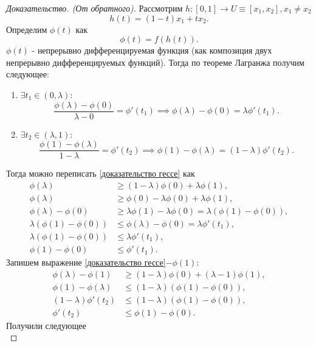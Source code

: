 \begin{theorem}
\begin{proof}[Доказательство. (От обратного)]
		Рассмотрим $h: [0,1]\to U \equiv [x_1, x_2], x_1\neq x_2$
		\begin{equation*}
			h(t)=(1-t)x_1 + tx_2.
		\end{equation*}
		Определим $\phi(t)$ как
		\begin{equation*}
			\phi(t) = f(h(t)).
		\end{equation*}
		$\phi(t)$ - непрерывно дифференцируемая функция (как композиция двух непрерывно дифференцируемых функций).
		Тогда по теореме Лагранжа получим следующее:
		\begin{enumerate}
			\item $\exists t_1\in(0,\lambda)$:
			\begin{equation*}
				\frac{\phi(\lambda)-\phi(0)}{\lambda-0}=\phi'(t_1)\implies \phi(\lambda)-\phi(0)=\lambda\phi'(t_1).
			\end{equation*}
			\item $\exists t_2\in(\lambda,1)$:
			\begin{equation*}
			\frac{\phi(1)-\phi(\lambda)}{1-\lambda}=\phi'(t_2)\implies \phi(1)-\phi(\lambda)=(1-\lambda)\phi'(t_2).
			\end{equation*}
		\end{enumerate}
		Тогда можно переписать \eqref{доказательство гессе} как
		\begin{align*}
			\phi(\lambda) &\geq (1-\lambda)\phi(0) + \lambda\phi(1),\\
			\phi(\lambda) &\geq \phi(0)-\lambda\phi(0) + \lambda\phi(1),\\
			\phi(\lambda) - \phi(0) &\geq \lambda\phi(1) - \lambda\phi(0) = \lambda(\phi(1)-\phi(0)),\\
			\lambda(\phi(1)-\phi(0)) &\leq \phi(\lambda)-\phi(0)=\lambda\phi'(t_1),\\
			\lambda(\phi(1)-\phi(0)) &\leq \lambda\phi'(t_1),\\
			\phi(1)-\phi(0) &\leq \phi'(t_1).
		\end{align*}
		Запишем выражение \eqref{доказательство гессе}$-\phi(1)$:
		\begin{align*}
			\phi(\lambda)-\phi(1)&\geq(1-\lambda)\phi(0)+(\lambda-1)\phi(1),\\
			\phi(1)-\phi(\lambda)&\leq(1-\lambda)(\phi(1)-\phi(0)),\\
			(1-\lambda)\phi'(t_2)&\leq(1-\lambda)(\phi(1)-\phi(0)),\\
			\phi'(t_2)&\leq\phi(1)-\phi(0).
		\end{align*}
		Получили следующее
		\begin{equation*}

\end{equation*}
\end{proof}
\end{theorem}
